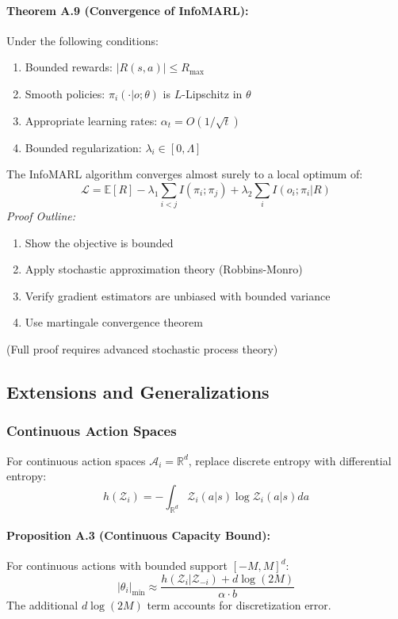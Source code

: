 \documentclass[10pt, letterpaper]{article}
\begin{document}
\paragraph{Theorem A.9 (Convergence of InfoMARL):} Under the following conditions:
\begin{enumerate}
    \item Bounded rewards: $|R(s,a)| \leq R_{\max}$
    \item Smooth policies: $\pi_i(\cdot|o; \theta)$ is $L$-Lipschitz in $\theta$
    \item Appropriate learning rates: $\alpha_t = O(1/\sqrt{t})$
    \item Bounded regularization: $\lambda_i \in [0, \Lambda]$
\end{enumerate}
The InfoMARL algorithm converges almost surely to a local optimum of:
\[\mathcal{L} = \mathbb{E}[R] - \lambda_1 \sum_{i<j} I(\pi_i; \pi_j) + \lambda_2 \sum_i I(o_i; \pi_i | R)\]
\emph{Proof Outline:}
\begin{enumerate}
    \item Show the objective is bounded
    \item Apply stochastic approximation theory (Robbins-Monro)
    \item Verify gradient estimators are unbiased with bounded variance
    \item Use martingale convergence theorem
\end{enumerate}
(Full proof requires advanced stochastic process theory)

\subsection{Extensions and Generalizations}

\subsubsection{Continuous Action Spaces}

For continuous action spaces $\mathcal{A}_i = \mathbb{R}^d$, replace discrete entropy with differential entropy:
\[h(\mathcal{Z}_i) = -\int_{\mathbb{R}^d} \mathcal{Z}_i(a|s) \log \mathcal{Z}_i(a|s) da\]

\paragraph{Proposition A.3 (Continuous Capacity Bound):} For continuous actions with bounded support $[-M, M]^d$:
\[|\theta_i|_{\min} \approx \frac{h(\mathcal{Z}_i | \mathcal{Z}_{-i}) + d\log(2M)}{\alpha \cdot b}\]
The additional $d\log(2M)$ term accounts for discretization error.
\end{document}
